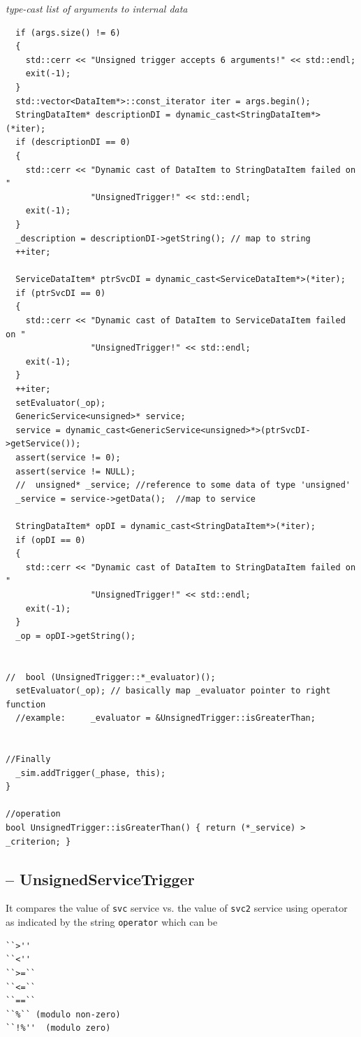 {\it type-cast list of arguments to internal data}
{\tiny
\begin{lstlisting}
  if (args.size() != 6)
  {
    std::cerr << "Unsigned trigger accepts 6 arguments!" << std::endl;
    exit(-1);
  }
  std::vector<DataItem*>::const_iterator iter = args.begin();
  StringDataItem* descriptionDI = dynamic_cast<StringDataItem*>(*iter);
  if (descriptionDI == 0)
  {
    std::cerr << "Dynamic cast of DataItem to StringDataItem failed on "
                 "UnsignedTrigger!" << std::endl;
    exit(-1);
  }
  _description = descriptionDI->getString(); // map to string
  ++iter;

  ServiceDataItem* ptrSvcDI = dynamic_cast<ServiceDataItem*>(*iter);
  if (ptrSvcDI == 0)
  {
    std::cerr << "Dynamic cast of DataItem to ServiceDataItem failed on "
                 "UnsignedTrigger!" << std::endl;
    exit(-1);
  }
  ++iter;
  setEvaluator(_op);
  GenericService<unsigned>* service;
  service = dynamic_cast<GenericService<unsigned>*>(ptrSvcDI->getService());
  assert(service != 0);
  assert(service != NULL);
  //  unsigned* _service; //reference to some data of type 'unsigned'
  _service = service->getData();  //map to service

  StringDataItem* opDI = dynamic_cast<StringDataItem*>(*iter);
  if (opDI == 0)
  {
    std::cerr << "Dynamic cast of DataItem to StringDataItem failed on "
                 "UnsignedTrigger!" << std::endl;
    exit(-1);
  }
  _op = opDI->getString();


//  bool (UnsignedTrigger::*_evaluator)();
  setEvaluator(_op); // basically map _evaluator pointer to right function
  //example:     _evaluator = &UnsignedTrigger::isGreaterThan;
  

//Finally
  _sim.addTrigger(_phase, this);
}

//operation
bool UnsignedTrigger::isGreaterThan() { return (*_service) > _criterion; }
\end{lstlisting}
}

\subsection{-- UnsignedServiceTrigger}
\label{sec:UnsignedServiceTrigger}

It compares the value of \verb!svc! service vs. the value of \verb!svc2! service
using operator as indicated by the string \verb!operator! which can be 
\begin{verbatim}
``>''
``<''
``>=``
``<=``
``==``
``%`` (modulo non-zero)
``!%''  (modulo zero)
\end{verbatim}


